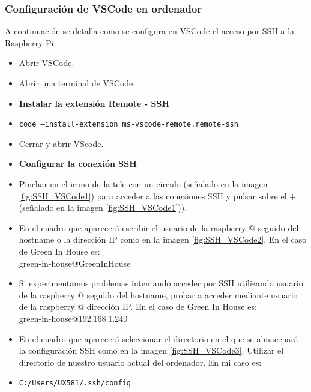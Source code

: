         \subsubsection{Configuración de VSCode en ordenador}
        A continuación se detalla como se configura en VSCode el acceso por SSH a la Raspberry Pi.
        \begin{itemize}
            \item Abrir VSCode.
            \item Abrir una terminal de VSCode.
            \item \textbf{Instalar la extensión Remote - SSH}
            \item \texttt{code --install-extension ms-vscode-remote.remote-ssh}
            \item Cerrar y abrir VScode.
            \item \textbf{Configurar la conexión SSH}
            \item Pinchar en el icono de la tele con un circulo (señalado en la imagen \ref{fig:SSH_VSCode1}) para acceder a las conexiones SSH y pulsar sobre el + (señalado en la imagen \ref{fig:SSH_VSCode1})).
            \\ 
            \item En el cuadro que aparecerá escribir el usuario de la raspberry @ seguido del hostname o la dirección IP como en la imagen \ref{fig:SSH_VSCode2}. En el caso de Green In House es:
            \\ green-in-house@GreenInHouse
            \\ 
            \item Si experimentamos problemas intentando acceder por SSH utilizando usuario de la raspberry @ seguido del hostname, probar a acceder mediante usuario de la raspberry @ dirección IP. En el caso de Green In House es:
            \\ green-in-house@192.168.1.240
            \item En el cuadro que aparecerá seleccionar el directorio en el que se almacenará la configuración SSH como en la imagen \ref{fig:SSH_VSCode3}. Utilizar el directorio de nuestro usuario actual del ordenador. En mi caso es:
            \item \texttt{C:/Users/UX581/.ssh/config}
            \\ 

\end{itemize}
